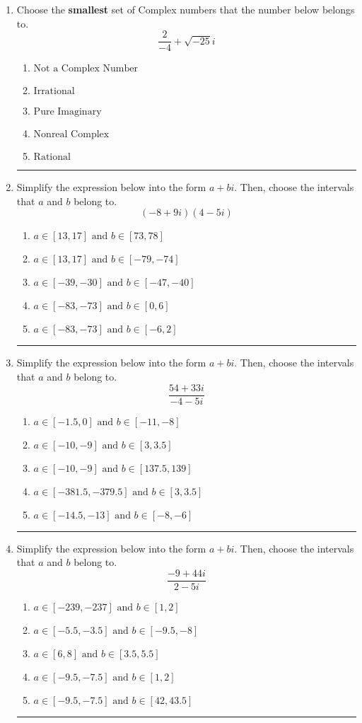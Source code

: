 \documentclass[14pt]{extbook}
\newcommand{\litem}[1]{\item#1\hspace*{-1cm}\rule{\textwidth}{0.4pt}}
\begin{document}
\begin{enumerate}
\litem{
Choose the \textbf{smallest} set of Complex numbers that the number below belongs to.\[ \frac{2}{-4}+\sqrt{-25}i \]\begin{enumerate}[label=\Alph*.]
\item \( \text{Not a Complex Number} \)
\item \( \text{Irrational} \)
\item \( \text{Pure Imaginary} \)
\item \( \text{Nonreal Complex} \)
\item \( \text{Rational} \)

\end{enumerate} }
\litem{
Simplify the expression below into the form $a+bi$. Then, choose the intervals that $a$ and $b$ belong to.\[ (-8 + 9 i)(4 - 5 i) \]\begin{enumerate}[label=\Alph*.]
\item \( a \in [13, 17] \text{ and } b \in [73, 78] \)
\item \( a \in [13, 17] \text{ and } b \in [-79, -74] \)
\item \( a \in [-39, -30] \text{ and } b \in [-47, -40] \)
\item \( a \in [-83, -73] \text{ and } b \in [0, 6] \)
\item \( a \in [-83, -73] \text{ and } b \in [-6, 2] \)

\end{enumerate} }
\litem{
Simplify the expression below into the form $a+bi$. Then, choose the intervals that $a$ and $b$ belong to.\[ \frac{54 + 33 i}{-4 - 5 i} \]\begin{enumerate}[label=\Alph*.]
\item \( a \in [-1.5, 0] \text{ and } b \in [-11, -8] \)
\item \( a \in [-10, -9] \text{ and } b \in [3, 3.5] \)
\item \( a \in [-10, -9] \text{ and } b \in [137.5, 139] \)
\item \( a \in [-381.5, -379.5] \text{ and } b \in [3, 3.5] \)
\item \( a \in [-14.5, -13] \text{ and } b \in [-8, -6] \)

\end{enumerate} }
\litem{
Simplify the expression below into the form $a+bi$. Then, choose the intervals that $a$ and $b$ belong to.\[ \frac{-9 + 44 i}{2 - 5 i} \]\begin{enumerate}[label=\Alph*.]
\item \( a \in [-239, -237] \text{ and } b \in [1, 2] \)
\item \( a \in [-5.5, -3.5] \text{ and } b \in [-9.5, -8] \)
\item \( a \in [6, 8] \text{ and } b \in [3.5, 5.5] \)
\item \( a \in [-9.5, -7.5] \text{ and } b \in [1, 2] \)
\item \( a \in [-9.5, -7.5] \text{ and } b \in [42, 43.5] \)


\end{enumerate}}
\end{enumerate}
\end{document}
